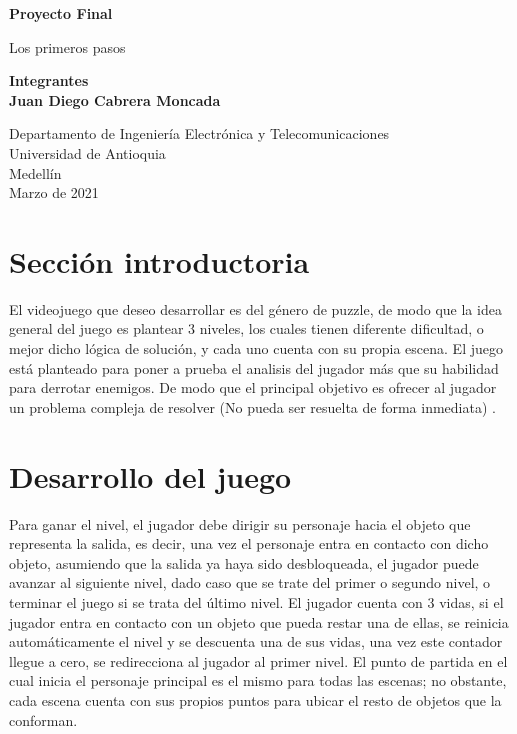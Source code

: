 \documentclass{article}
\begin{document}
\begin{titlepage}
    \begin{center}
        \vspace*{1cm}
            
        \Huge
        \textbf{Proyecto Final}
            
        \vspace{0.5cm}
        \LARGE
        Los primeros pasos
            
        \vspace{1.5cm}
            
        \textbf{Integrantes\\}
        \textbf{Juan Diego Cabrera Moncada}
            
        \vfill
            
        \vspace{0.8cm}
            
        \Large
        Departamento de Ingeniería Electrónica y Telecomunicaciones\\
        Universidad de Antioquia\\
        Medellín\\
        Marzo de 2021
            
    \end{center}
\end{titlepage}

\tableofcontents
\newpage
\section{Sección introductoria}\label{intro}
El videojuego que deseo desarrollar es del género de puzzle, de modo que la idea general del juego es plantear 3 niveles, los cuales tienen diferente dificultad, o mejor dicho lógica de solución, y cada uno cuenta con su propia escena. El juego está planteado para poner a prueba el analisis del jugador más que su habilidad para derrotar enemigos. De modo que el principal objetivo es ofrecer al jugador un problema compleja de resolver (No pueda ser resuelta de forma inmediata) \cite{Puzzle}.
\section{Desarrollo del juego}
Para ganar el nivel, el jugador debe dirigir su personaje hacia el objeto que representa la salida, es decir, una vez el personaje entra en contacto con dicho objeto, asumiendo que la salida ya haya sido desbloqueada, el jugador puede avanzar al siguiente nivel, dado caso que se trate del primer o segundo nivel, o terminar el juego si se trata del último nivel. El jugador cuenta con 3 vidas, si el jugador entra en contacto con un objeto que pueda restar una de ellas, se reinicia automáticamente el nivel y se descuenta una de sus vidas, una vez este contador llegue a cero, se redirecciona al jugador al primer nivel. El punto de partida en el cual inicia el personaje principal es el mismo para todas las escenas; no obstante, cada escena cuenta con sus propios puntos para ubicar el resto de objetos que la conforman.
\end{document}
